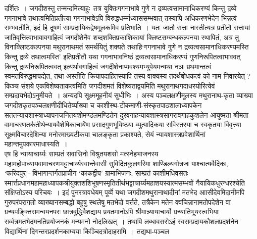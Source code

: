 \documentclass[10pt, openany]{book}
\begin{document}
\newpage
\noindent
दर्शितः~। जगदीशस्तु तन्मन्दमित्याहुः~\textendash   तत्र युक्तिः\textemdash गगनाभावे गुणे न द्रव्यत्वसामानाधिकरण्यं किन्तु द्रव्ये गगनाभावे तथात्वमितिप्रतीत्या गगनाभावेऽपि विरुद्धधर्म्माध्याससम्भवात् तस्यापि अधिकरणभेदेन भिन्नत्वं सम्भवतीति, इदं हि दूषणं साम्प्रदायिकद्वेषमूलकमिव प्रतिभाति~। यतः जातौ सत्ता नास्तीत्यत्र प्रतीतौ सत्तायां जातिवृत्तित्वाभावावगाहित्वं जगदीशेनैव शब्दशक्तिप्रकाशिकायां क्लिष्टसम्बन्धकल्पनया स्थापितं, अत्र तु विनाक्लिष्टकल्पनया मथुरानाथमतं समर्थयितुं शक्यते तथाहि\textendash  `गगनाभावे गुणे न द्रव्यत्वसामानाधिकरण्यमस्ति किन्तु द्रव्ये तथात्वमस्ति' इतिप्रतीतौ यथा गगनाभावनिष्ठं द्रव्यत्वसामानाधिकरण्यं गुणनिरूपितत्वाभाववत् किन्तु द्रव्यनिरूपितत्ववत् इत्यर्थावगाहित्वं जगदीशेनाप्यवश्यमभ्युपेयमन्यथा  नञः प्रथमान्तत्वं स्वमतविरुद्धमापद्येत, तथा अस्तीति क्रियापदाहितस्यापि तस्य वाक्यस्य तदर्थबोधकत्वं को नाम निवारयेत् ? किञ्च संशये एकविशेष्यताकत्वमिति जगदीशमतं विशेष्यताद्वयमिति मथुरानाथगदाधरयोरित्येवं सम्प्रदायभेदोऽनुमीयते~। अन्यदपि सूक्ष्ममूहनीयं सुधीभिः~। {\qt अस्य पञ्चलक्षणीमूलस्य मथुरानाथ-कृता व्याख्या जगदीशकृतपञ्चलक्षणीदीधितेर्व्याख्या च काशीस्थ-टीकमाणी-संस्कृतपाठशालाध्यापकेन सततन्यायशास्त्राध्यापनजनितयशोमण्डलमण्डितेन
दुरवगाहन्यायशास्त्रसागरावगाहकुशलेन आयुष्मता श्रीमता वामाचरणतर्कतीर्थन्यायवैशेषिकाचार्येण प्रसादगुणभूयिष्ठया व्युत्पादिकया सविस्तरया च स्वकृतया विवृत्त्या सूक्ष्मविचारदेशिन्या मनोरमाख्यटीकया चालङ्कृता प्रकाश्यते, सेयं न्यायशास्त्रप्रवेशार्थिनां
महान्तमुपकारमाधास्यति~}। \\

एष हि न्यायाचार्य्यः साम्प्रतं सवासिनो विश्रुतयशसो मत्स्नेहभाजनस्य महामहोपाध्यायवामाचरणभट्टाचार्य्यस्वान्तेवासी सुविदितकुलगरिमा {\qt शाण्डिल्यगोत्रजः} पाश्चात्यवैदिकः,
{\qt`फरिदपुर'}- विभागान्तर्गतप्राचीन {\qt`काकद्वीप'} ग्रामाभिजनः, साम्प्रतं काशीमधिवसतः स्मार्त्तप्रधानमहामहाध्यापकश्रीयुक्तशशिभूषणस्मृतितीर्थभट्टाचार्य्यमहाशयस्यात्मसम्भवों नैयायिकधुरन्धरश्चेति संक्षिप्तोऽस्य परिचयः~। इदं पुनरत्रावधेयम् पूर्व्वे यथा जगदीशमथुरानाथादीनां मतभेद आासीदेवमिदानीमपि गुरुपरंपरागतो व्याख्यानसम्बद्धो बहुषु स्थलेषु मतभेदो वर्त्तते, तत्रैकेन मतेन क्वचिन्नानामतोपदेशेन वा ग्रन्थपङ्क्तिसमन्वयनपरः छात्रबुद्धिवैशद्याय प्रयतमानोऽपि श्रीमान्न्यायाचार्यो ग्रन्थातिभूयस्त्वभिया सर्व्वत्रमतभेदमनतिप्रयोजनकं मन्यमनो नोदलिखत्~। तथापि लब्धावसरोऽहं स्वसम्प्रदायकौशलप्रदर्शनेन विद्यार्थिनां दिगन्तरप्रदर्शनकाम्यया किञ्चिदत्रोदाहरामि~। तद्यथा-पञ्चल
\end{document}
